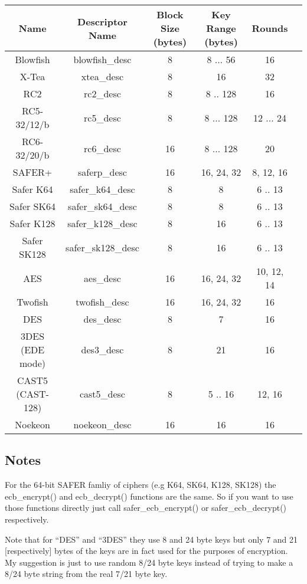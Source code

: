 \documentclass{book}
\begin{document}
\begin{small}
\begin{center}
\begin{tabular}{|c|c|c|c|c|c|}
     \hline Name & Descriptor Name & Block Size (bytes) & Key Range (bytes) & Rounds \\
     \hline Blowfish & blowfish\_desc & 8 & 8 ... 56 & 16 \\
     \hline X-Tea & xtea\_desc & 8 & 16 & 32 \\
     \hline RC2 & rc2\_desc & 8 & 8 .. 128 & 16 \\
     \hline RC5-32/12/b & rc5\_desc & 8 & 8 ... 128 & 12 ... 24 \\
     \hline RC6-32/20/b & rc6\_desc & 16 & 8 ... 128 & 20 \\
     \hline SAFER+ & saferp\_desc &16 & 16, 24, 32 & 8, 12, 16 \\
     \hline Safer K64   & safer\_k64\_desc & 8 & 8 & 6 .. 13 \\
     \hline Safer SK64  & safer\_sk64\_desc & 8 & 8 & 6 .. 13 \\
     \hline Safer K128  & safer\_k128\_desc & 8 & 16 & 6 .. 13 \\
     \hline Safer SK128 & safer\_sk128\_desc & 8 & 16 & 6 .. 13 \\
     \hline AES & aes\_desc & 16 & 16, 24, 32 & 10, 12, 14 \\
     \hline Twofish & twofish\_desc & 16 & 16, 24, 32 & 16 \\
     \hline DES & des\_desc & 8 & 7 & 16 \\
     \hline 3DES (EDE mode) & des3\_desc & 8 & 21 & 16 \\
     \hline CAST5 (CAST-128) & cast5\_desc & 8 & 5 .. 16 & 12, 16 \\
     \hline Noekeon & noekeon\_desc & 16 & 16 & 16 \\
     \hline
\end{tabular}
\end{center}
\end{small}

\subsection{Notes}
For the 64-bit SAFER famliy of ciphers (e.g K64, SK64, K128, SK128) the ecb\_encrypt() and ecb\_decrypt()
functions are the same.  So if you want to use those functions directly just call safer\_ecb\_encrypt()
or safer\_ecb\_decrypt() respectively.

Note that for ``DES'' and ``3DES'' they use 8 and 24 byte keys but only 7 and 21 [respectively] bytes of the keys are in
fact used for the purposes of encryption.  My suggestion is just to use random 8/24 byte keys instead of trying to make a 8/24
byte string from the real 7/21 byte key.
\end{document}
